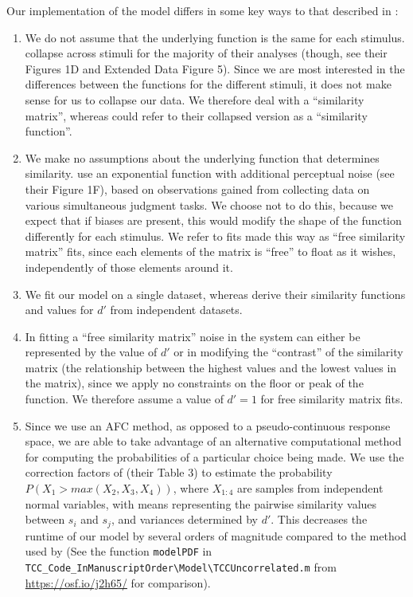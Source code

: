 Our implementation of the model differs in some key ways to that described in \cite{schurgin_psychophysical_2020}:
\begin{enumerate}
\item We do not assume that the underlying function is the same for each stimulus. 
\cite{schurgin_psychophysical_2020} collapse across stimuli for the majority of their analyses (though, see their Figures 1D and Extended Data Figure 5). 
Since we are most interested in the differences between the functions for the different stimuli, it does not make sense for us to collapse our data. 
We therefore deal with a ``similarity matrix'', whereas \cite{schurgin_psychophysical_2020} could refer to their collapsed version as a ``similarity function''.
\item We make no assumptions about the underlying function that determines similarity. \cite{schurgin_psychophysical_2020} use an exponential function with additional perceptual noise (see their Figure 1F), based on observations gained from collecting data on various simultaneous judgment tasks. We choose not to do this, because we expect that if biases are present, this would modify the shape of the function differently for each stimulus. We refer to fits made this way as ``free similarity matrix'' fits, since each elements of the matrix is ``free'' to float as it wishes, independently of those elements around it.
\item We fit our model on a single dataset, whereas \cite{schurgin_psychophysical_2020} derive their similarity functions and values for $d'$ from independent datasets. %
\item In fitting a ``free similarity matrix'' noise in the system can either be represented by the value of $d'$ or in modifying the ``contrast'' of the similarity matrix (the relationship between the highest values and the lowest values in the matrix), since we apply no constraints on the floor or peak of the function. 
We therefore assume a value of $d' = 1$ for free similarity matrix fits. %
\item Since we use an AFC method, as opposed to a pseudo-continuous response space, we are able to take advantage of an alternative computational method for computing the probabilities of a particular choice being made.
We use the correction factors of \cite{mcgraw_common_1992} (their Table 3) to estimate the probability $P(X_1>max(X_2,X_3,X_4))$, where $X_{1:4}$ are samples from independent normal variables, with means representing the pairwise similarity values between $s_i$ and $s_j$, and variances determined by $d'$.
This decreases the runtime of our model by several orders of magnitude compared to the method used by \cite{schurgin_psychophysical_2020} (See the function \lstinline{modelPDF} in \lstinline{TCC_Code_InManuscriptOrder\Model\TCCUncorrelated.m} from \url{https://osf.io/j2h65/} for comparison).
\end{enumerate}

